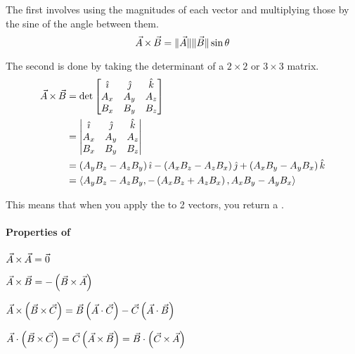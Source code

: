 The first involves using the magnitudes of each vector and multiplying those by the sine of the angle between them.
\begin{equation} \label{eq:Cross Product Magnitudes}
  \vec{A} \operatorname{\times} \vec{B} = \lVert \vec{A} \rVert \lVert \vec{B} \rVert \sin \theta
\end{equation}

The second is done by taking the determinant of a $2 \times 2$ or $3 \times 3$ matrix.
\begin{equation} \label{eq:Cross Product Determinant}
  \begin{aligned}
    \vec{A} \operatorname{\times} \vec{B}
    &= \det \begin{bmatrix}
      \hat{\imath} & \hat{\jmath} & \hat{k} \\
      A_{x} & A_{y} & A_{z} \\
      B_{x} & B_{y} & B_{z}
    \end{bmatrix} \\
    &= \begin{vmatrix}
      \hat{\imath} & \hat{\jmath} & \hat{k} \\
      A_{x} & A_{y} & A_{z} \\
      B_{x} & B_{y} & B_{z}
    \end{vmatrix} \\
    &= \left( A_{y}B_{z}-A_{z}B_{y} \right) \hat{\imath} - \left( A_{x}B_{z}-A_{z}B_{x} \right) \hat{\jmath} + \left( A_{x}B_{y} - A_{y}B_{x} \right) \hat{k} \\
    &= \langle A_{y}B_{z}-A_{z}B_{y}, - \left( A_{x}B_{z}+A_{z}B_{x} \right), A_{x}B_{y}-A_{y}B_{x} \rangle
  \end{aligned}
\end{equation}

\begin{remark*}
  This means that when you apply the  to 2 vectors, you return a .
\end{remark*}

\paragraph{Properties of } \label{par:Cross Product Properties}
\begin{propertylist}
  \item $\vec{A} \operatorname{\times} \vec{A} = \vec{0}$
  \item $\vec{A} \operatorname{\times} \vec{B} = - \left( \vec{B} \operatorname{\times} \vec{A} \right)$
  \item $\vec{A} \operatorname{\times} \left( \vec{B} \operatorname{\times} \vec{C} \right) = \vec{B} \left( \vec{A} \cdot \vec{C}\right) - \vec{C} \left( \vec{A} \cdot \vec{B} \right)$
  \item $\vec{A} \cdot \left( \vec{B} \operatorname{\times} \vec{C} \right) = \vec{C} \left( \vec{A} \operatorname{\times} \vec{B} \right) = \vec{B} \cdot \left( \vec{C} \operatorname{\times} \vec{A} \right)$
\end{propertylist}

